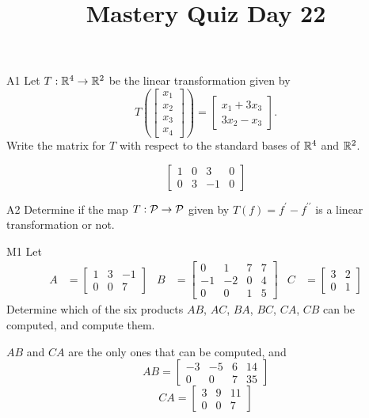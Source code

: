 \documentclass{sbgLAquiz}
\title{Mastery Quiz Day 22 }
\begin{document}
\begin{problem}{A1}
Let $T: \IR^4 \rightarrow \IR^2$ be the linear transformation given by $$T\left(\begin{bmatrix} x_1 \\ x_2 \\ x_3 \\ x_4 \end{bmatrix} \right) = \begin{bmatrix} x_1+3x_3 \\ 3x_2-x_3 \end{bmatrix}.$$ Write the matrix for $T$ with respect to the standard bases of $\IR^4$ and $\IR^2$.
\end{problem}
\begin{solution}
$$\begin{bmatrix} 1 & 0 & 3 & 0 \\ 0 & 3 & -1 & 0 \end{bmatrix}$$
\end{solution}


\begin{problem}{A2}
Determine if the map $T: \P  \rightarrow \P$ given by $T(f) = f^{\prime}-f^{\prime \prime}$ is a linear transformation or not.
\end{problem}


\begin{extract}\newpage\end{extract}
\begin{problem}{M1}
Let 
\begin{align*}
A &= \begin{bmatrix} 1 & 3 & -1  \\ 0 & 0 & 7  \end{bmatrix} & B &= \begin{bmatrix} 0 & 1 & 7 & 7 \\ -1 & -2 & 0 & 4 \\ 0 & 0 & 1 & 5 \end{bmatrix} & C&=\begin{bmatrix} 3 & 2 \\ 0 & 1 \end{bmatrix}
\end{align*}
Determine which of the six products $AB$, $AC$, $BA$, $BC$, $CA$, $CB$ can be computed, and compute them.
\end{problem}
\begin{solution}
$AB$ and $CA$ are the only ones that can be computed, and 
$$AB = \begin{bmatrix} -3 & -5 & 6 & 14 \\ 0 & 0 & 7 & 35 \end{bmatrix}$$
$$CA = \begin{bmatrix} 3 & 9 & 11  \\ 0 & 0 & 7    \end{bmatrix}$$
\end{solution}
\end{document}

